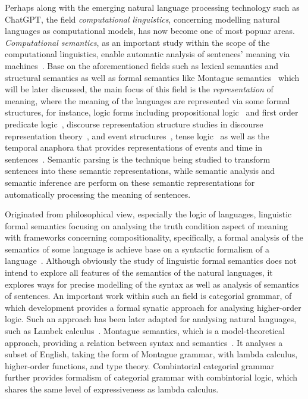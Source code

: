 Perhaps along with the emerging natural language processing technology such as ChatGPT, the field \emph{computational linguistics}, concerning modelling natural languages as computational models, has now become one of most popuar areas. \emph{Computational semantics}, as an important study within the scope of the computational linguistics, enable automatic analysis of sentences' meaning via machines~\citep{mitkov2022}. Base on the aforementioned fields such as lexical semantics and structural semantics as well as formal semantics like Montague semantics~\citep{Montague1970-MONEAA-2} which will be later discussed, the main focus of this field is the \emph{representation} of meaning, where the meaning of the languages are represented via some formal structures, for instance, logic forms including propositional logic~\citep{boole1854investigation} and first order predicate logic~\citep{Frege1879-FREBAF-2}, discourse representation structure studies in discourse representation theory~\citep{Kamp1993-KAMFDT}, and event structures~\citep{PUSTEJOVSKY199147}, tense logic~\citep{Prior1955-PRITAM, Kamp1968-KAMTLA} as well as the temporal anaphora that provides representations of events and time in sentences~\citep{partee1884, hinrichs1986}. Semantic parsing is the technique being studied to transform sentences into these semantic representations, while semantic analysis and semantic inference are perform on these semantic representations for automatically processing the meaning of sentences. 

Originated from philosophical view, especially the logic of languages, linguistic formal semantics focusing on analysing the truth condition aspect of meaning with frameworks concerning compositionality, specifically, a formal analysis of the semantics of some language is achieve base on a syntactic formalism of a language~\citep{alma999704883502466}. Although obviously the study of linguistic formal semantics does not intend to explore all features of the semantics of the natural languages, it explores ways for precise modelling of the syntax as well as analysis of semantics of sentences. An important work within such an field is categorial grammar, of which  development provides a formal synatic approach for analysing higher-order logic. Such an approach has been later adapted for analysing natural languages, such as Lambek calculus~\citep{Lambek1958-LAMTMO-5}. Montague semantics, which is a model-theoretical approach, providing a relation between syntax and semantics~\citep{Montague1970-MONEAA-2}. It analyses a subset of English, taking the form of Montague grammar, with lambda calculus, higher-order functions, and type theory. Combintorial categorial grammar~\citep{steedman2001, steedman2011combinatory} further provides formalism of categorial grammar with combintorial logic, which shares the same level of expressiveness as lambda calculus.
\begin{center}
\vspace{-0.7em}
\vspace{-0.3em}
\end{center}

